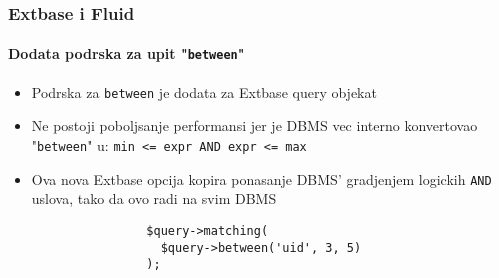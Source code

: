 
\begin{frame}[fragile]
	\frametitle{Extbase i Fluid}
	\framesubtitle{Dodata podrska za upit "\texttt{between}"}

	\begin{itemize}

		\item Podrska za \texttt{between} je dodata za Extbase query objekat

		\item Ne postoji poboljsanje performansi jer je DBMS vec interno konvertovao
			"\texttt{between}" u: \texttt{min <= expr AND expr <= max}

		\item Ova nova Extbase opcija kopira ponasanje DBMS' gradjenjem logickih 
			\texttt{AND} uslova, tako da ovo radi na svim DBMS

			\begin{lstlisting}
				$query->matching(
				  $query->between('uid', 3, 5)
				);
			\end{lstlisting}

	\end{itemize}

\end{frame}


